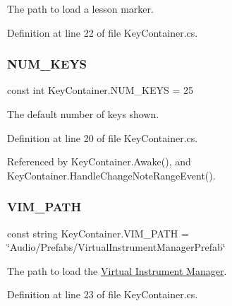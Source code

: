 The path to load a lesson marker. 



Definition at line 22 of file Key\+Container.\+cs.

\mbox{\label{group___key_contain_const_gaa8fe6473e6396976e52c5793f027380e}} 
\subsubsection{\texorpdfstring{N\+U\+M\+\_\+\+K\+E\+YS}{NUM\_KEYS}}
{\footnotesize\ttfamily const int Key\+Container.\+N\+U\+M\+\_\+\+K\+E\+YS = 25\hspace{0.3cm}{\ttfamily [private]}}



The default number of keys shown. 



Definition at line 20 of file Key\+Container.\+cs.



Referenced by Key\+Container.\+Awake(), and Key\+Container.\+Handle\+Change\+Note\+Range\+Event().

\mbox{\label{group___key_contain_const_ga8dc749271ab095b5759129459bcb647a}} 
\subsubsection{\texorpdfstring{V\+I\+M\+\_\+\+P\+A\+TH}{VIM\_PATH}}
{\footnotesize\ttfamily const string Key\+Container.\+V\+I\+M\+\_\+\+P\+A\+TH = \char`\"{}Audio/Prefabs/Virtual\+Instrument\+Manager\+Prefab\char`\"{}\hspace{0.3cm}{\ttfamily [private]}}



The path to load the \hyperlink{group___v_i_m}{Virtual Instrument Manager}. 



Definition at line 23 of file Key\+Container.\+cs.

\mbox{\label{group___key_contain_const_ga8ce7e53d5c067095ee26b96fcc522584}} 
